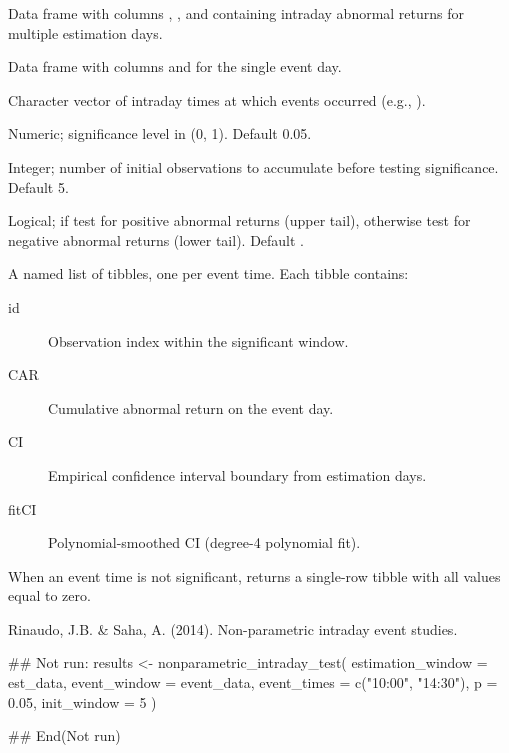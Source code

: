 \documentclass[a4paper]{book}
\begin{document}
%
\begin{Arguments}
\begin{ldescription}
\item[\code{estimation\_window}] Data frame with columns , ,
and  containing intraday abnormal returns for
multiple estimation days.

\item[\code{event\_window}] Data frame with columns  and
 for the single event day.

\item[\code{event\_times}] Character vector of intraday times at which events
occurred (e.g., ).

\item[\code{p}] Numeric; significance level in (0, 1). Default 0.05.

\item[\code{init\_window}] Integer; number of initial observations to accumulate
before testing significance. Default 5.

\item[\code{upper}] Logical; if  test for positive abnormal returns
(upper tail), otherwise test for negative abnormal returns (lower tail).
Default .
\end{ldescription}
\end{Arguments}
%
\begin{Value}
A named list of tibbles, one per event time. Each tibble contains:
\begin{description}

\item[id] Observation index within the significant window.
\item[CAR] Cumulative abnormal return on the event day.
\item[CI] Empirical confidence interval boundary from estimation days.
\item[fitCI] Polynomial-smoothed CI (degree-4 polynomial fit).

\end{description}

When an event time is not significant, returns a single-row tibble with
all values equal to zero.
\end{Value}
%
\begin{References}
Rinaudo, J.B. \& Saha, A. (2014). Non-parametric intraday event studies.
\end{References}
%
\begin{Examples}
\begin{ExampleCode}
## Not run: 
results <- nonparametric_intraday_test(
  estimation_window = est_data,
  event_window = event_data,
  event_times = c("10:00", "14:30"),
  p = 0.05,
  init_window = 5
)

## End(Not run)

\end{ExampleCode}
\end{Examples}
\end{document}
